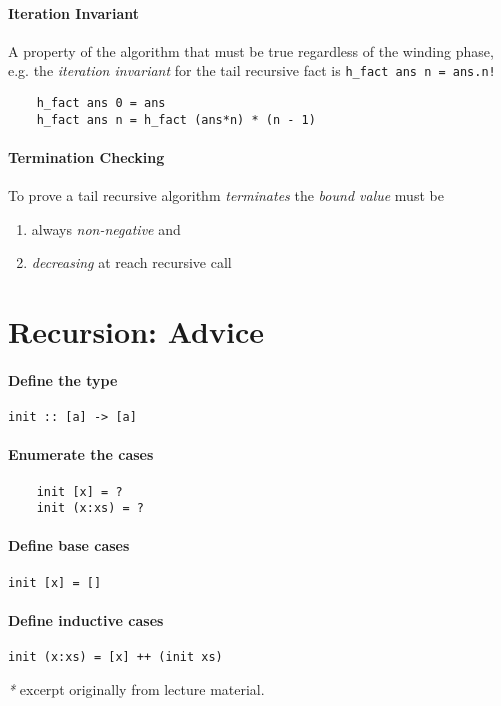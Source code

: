 \documentclass{article}
\begin{document}
\paragraph{Iteration Invariant}
A property of the algorithm that must be true regardless of the winding phase, e.g. the \textcolor{Rhodamine}{\emph{iteration invariant}} for the tail recursive fact is \texttt{\textcolor{Emerald}{h\_fact ans n} = ans.n!}
\begin{verbatim}
    h_fact ans 0 = ans 
    h_fact ans n = h_fact (ans*n) * (n - 1)
\end{verbatim}

\paragraph{Termination Checking} 
To prove a tail recursive algorithm \textcolor{Rhodamine}{\emph{terminates}} the \textcolor{Rhodamine}{\emph{bound value}} must be
\begin{enumerate}
    \item always \textcolor{Rhodamine}{\emph{non-negative}} and
    \item \textcolor{Rhodamine}{\emph{decreasing}} at reach recursive call
\end{enumerate}

\section{Recursion: Advice}
\paragraph{\textcolor{NavyBlue}{Define the type}} \texttt{init :: [a] -> [a]}
\paragraph{\textcolor{NavyBlue}{Enumerate the cases}}
\begin{verbatim}
    init [x] = ?
    init (x:xs) = ?
\end{verbatim}
\paragraph{\textcolor{NavyBlue}{Define base cases}}
\texttt{init [x] = []}
\paragraph{\textcolor{NavyBlue}{Define inductive cases}}
\texttt{init (x:xs) = [x] ++ (init xs)}

\textcolor{Rhodamine}{\emph{*}} excerpt originally from lecture material.
\end{document}
